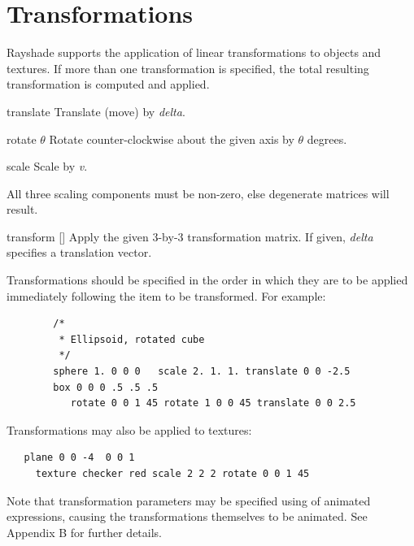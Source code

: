 \chapter {Transformations}

Rayshade supports the application of linear transformations to objects
and textures.  If more than one transformation is specified, the
total resulting transformation is computed and applied.

\begin{defkey}{translate}{}
Translate (move) by {\em delta}.
\end{defkey}

\begin{defkey}{rotate}{ $\theta$}
Rotate counter-clockwise about the given axis by $\theta$ degrees.
\end{defkey}

\begin{defkey}{scale}{}
Scale by {\em v}.
\end{defkey}
All three scaling components must be non-zero, else degenerate matrices
will result.

\begin{defkey}{transform}{   []}
Apply the given 3-by-3 transformation matrix.  If given, {\em delta}
specifies a translation vector.
\end{defkey}

Transformations should
be specified in the order in which they are to be applied
immediately following the item to
be transformed.  For example:

\begin{verbatim}
        /*
         * Ellipsoid, rotated cube
         */
        sphere 1. 0 0 0   scale 2. 1. 1. translate 0 0 -2.5
        box 0 0 0 .5 .5 .5
           rotate 0 0 1 45 rotate 1 0 0 45 translate 0 0 2.5
\end{verbatim}

Transformations may also be applied to textures:

\begin{verbatim}
   plane 0 0 -4  0 0 1
     texture checker red scale 2 2 2 rotate 0 0 1 45
\end{verbatim}

Note that transformation parameters may be specified using
of animated expressions, causing the transformations themselves
to be animated.  See Appendix B for further details.
